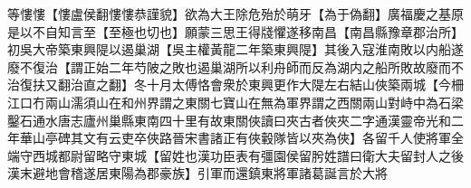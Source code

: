 等慺慺【慺盧侯翻慺慺恭謹貌】欲為大王除危殆於萌牙【為于偽翻】廣福慶之基原是以不自知言至【至極也切也】願蒙三思王得牋懼遂移南昌【南昌縣豫章郡治所】初吳大帝築東興隄以遏巢湖【吳主權黃龍二年築東興隄】其後入寇淮南敗以内船遂廢不復治【謂正始二年芍陂之敗也遏巢湖所以利舟師而反為湖内之船所敗故廢而不治復扶又翻治直之翻】冬十月太傅恪會衆於東興更作大隄左右結山俠築兩城【今柵江口冇兩山濡須山在和州界謂之東關七寶山在無為軍界謂之西關兩山對峙中為石梁鑿石通水唐志廬州巢縣東南四十里有故東關俠讀曰夾古者俠夾二字通漢靈帝光和二年華山亭碑其文有云吏卒俠路晉宋書諸正有俠轂隊皆以夾為俠】各留千人使將軍全端守西城都尉留略守東城【留姓也漢功臣表有彊園侯留肹姓譜曰衛大夫留封人之後漢末避地會稽遂居東陽為郡豪族】引軍而還鎮東將軍諸葛誕言於大將